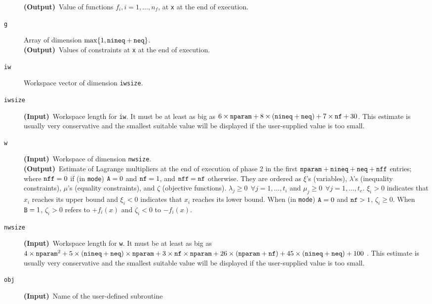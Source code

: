\begin{description}
                  {\bf (Output)}~Value of functions 
                  $f_i,i=1,\ldots,n_f$, at {\tt x} at the end of 
                  execution.
\item[\tt g]      Array of dimension $\max\{1,{\tt nineq}+{\tt neq}\}$.\\
                  {\bf (Output)}~Values of constraints at {\tt x} at 
                   the end of execution.
\item[\tt iw]  Workspace vector of dimension {\tt iwsize}.
\item[\tt iwsize]  {\bf (Input)}~Workspace length 
                for {\tt iw}. It must be at least as big as
       $6\times {\tt nparam}+8\times ({\tt nineq}+{\tt neq})
       +7\times{\tt nf}+30$. This estimate is usually very conservative
       and the smallest suitable value will be
       displayed if the user-supplied value is too small.
\item[\tt w]      {\bf (Input)}~Workspace of dimension {\tt nwsize}. \\
                  {\bf (Output)}~Estimate of Lagrange multipliers at 
                  the end of execution of phase 2 in the 
                  first ${\tt nparam}+{\tt nineq+neq+nff}$ entries;
            where ${\tt nff}=0$ if (in {\tt mode}) ${\tt A}=0$ and
          ${\tt nf}=1$, and ${\tt nff}={\tt nf}$ otherwise.
       They are ordered as $\xi$'s (variables), $\lambda$'s (inequality
      constraints), $\mu$'s (equality constraints), and $\zeta$ 
      (objective functions).
        $\lambda _j \geq 0~~\forall j=1,\ldots,t_i$
        and $\mu _j \ge 0~~\forall j=1,\ldots,t_e.$ $\xi _i > 0$
        indicates that $x_i$ reaches its upper bound and $\xi _i <0$
        indicates that $x_i$ reaches its lower bound. When
        (in {\tt mode}) ${\tt A}=0$ and ${\tt nf}>1$, $\zeta _i \geq0.$
        When ${\tt B}=1$, $\zeta _i >0$ refers to
        $+f_i(x)$ and $\zeta _i<0$ to $-f_i(x)$.
\item[\tt nwsize] {\bf (Input)}~Workspace length for {\tt w}. 
                   It must be at least as big as
                    $4\times {\tt nparam}^{2}+
                    5\times ({\tt nineq}+{\tt neq})\times{\tt nparam}+
                    3\times{\tt nf}\times{\tt nparam}+
         26\times ({\tt nparam}+{\tt nf})+45\times ({\tt nineq}+{\tt neq})+100$
.  This estimate
         is usually very conservative and the
         smallest suitable value will be 
         displayed if the user-supplied value is too small.
\item[\tt obj]   {\bf (Input)}~Name of the user-defined subroutine

\end{description}
